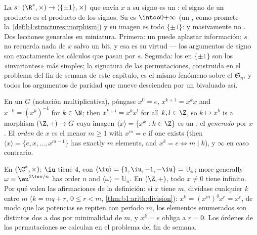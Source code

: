 \begin{example}\label{ex:b1:structures:signmorphism}
La  $s \colon (\R^*, \times) \to (\{\pm1\}, \times)$ que
envía $x$ a su signo es un : el signo de un producto es el
producto de los signos. Su  es $\intoo0{+\infty}$ (un
, como promete la~\cref{def:b1:structures:morphism}) y su imagen
es todo $\{\pm1\}$:  y masivamente no . Dos
lecciones generales en miniatura. Primera: un  puede aplastar
información; $s$ no recuerda nada de $x$ salvo un bit, y esa es su
virtud --- los argumentos de signo son exactamente los cálculos que
pasan por $s$. Segunda: los  en $\{\pm1\}$ son los
«invariantes» más simples; la signatura de las permutaciones,
construida en el problema del fin de semana de este capítulo, es el
mismo fenómeno sobre el  $\mathfrak S_n$, y todos los argumentos
de paridad que mueve descienden por un  bivaluado así.
\end{example}

\begin{definition}\label{def:b1:structures:order}
En un  $G$ (notación multiplicativa), póngase $x^0 = e$, $x^{k+1} =
x^k x$ and $x^{-k} = (x^k)^{-1}$ for $k \in \N$; then $x^{k+l} = x^k
x^l$ for all $k, l \in \Z$, so $k \mapsto x^k$ is a morphism $(\Z,
+) \to G$ cuya imagen $\langle x \rangle = \{x^k : k \in \Z\}$ es un
, el  \emph{generado} por $x$. El
\emph{orden} de $x$ es el menor $m \geq
1$ with $x^m = e$ if one exists (then $\langle x\rangle = \{e, x,
\dots, x^{m-1}\}$ has exactly $m$ elements, and $x^k = e \iff m
\mid k$), y $\infty$ en caso contrario.
\end{definition}

\begin{example}\label{ex:b1:structures:order}
En $(\C^*, \times)$: $\iu$ tiene  $4$, con $\langle \iu \rangle
= \{1, \iu, -1, -\iu\} = \mathbb{U}_4$; more generally $\omega =
\eu^{2\iu\pi/n}$ has order $n$ and $\langle\omega\rangle =
\mathbb{U}_n$. En $(\Z, +)$, todo $x \neq 0$ tiene  infinito.
Por qué valen las afirmaciones de la definición: si $x$ tiene 
$m$, divídase cualquier $k$ entre $m$ ($k = mq + r$, $0 \leq r < m$,
\cref{thm:b1:arith:division}): $x^k = (x^m)^q x^r = x^r$, de modo que
las potencias se repiten con período $m$, los elementos enumerados son
distintos dos a dos por minimalidad de $m$, y $x^k = e$ obliga a
$r = 0$. Los órdenes de las permutaciones se calculan en el problema
del fin de semana.
\end{example}

